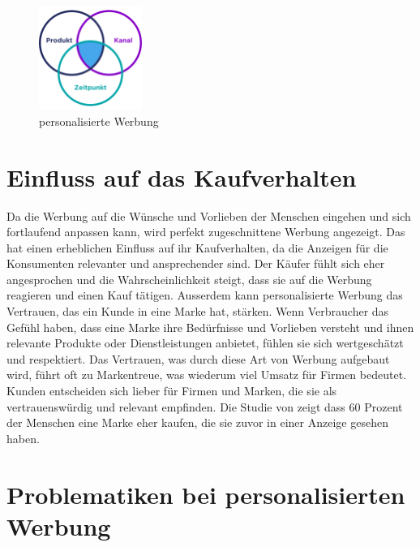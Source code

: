 \documentclass{article}
\begin{document}
 \begin{figure}[ht]
    \centering
    \includegraphics[width=0.3\textwidth]{Infografik.jpg}
    \caption{personalisierte Werbung}
    \label{fig:personaliserte Werbung}
    \end{figure}

 \section{Einfluss auf das Kaufverhalten}
Da die Werbung auf die Wünsche und Vorlieben der Menschen eingehen und sich fortlaufend anpassen kann, wird perfekt zugeschnittene Werbung angezeigt. Das hat einen erheblichen Einfluss auf ihr Kaufverhalten, da die Anzeigen für die Konsumenten relevanter und ansprechender sind. Der Käufer fühlt sich eher angesprochen und die Wahrscheinlichkeit steigt, dass sie auf die Werbung reagieren und einen Kauf tätigen. Ausserdem kann personalisierte Werbung das Vertrauen, das ein Kunde in eine Marke hat, stärken. Wenn Verbraucher das Gefühl haben, dass eine Marke ihre Bedürfnisse und Vorlieben versteht und ihnen relevante Produkte oder Dienstleistungen anbietet, fühlen sie sich wertgeschätzt und respektiert. Das Vertrauen, was durch diese Art von Werbung aufgebaut wird, führt oft zu Markentreue, was wiederum viel Umsatz für Firmen bedeutet. Kunden entscheiden sich lieber für Firmen und Marken, die sie als vertrauenswürdig und relevant empfinden. Die Studie von \citet{Nielsen} zeigt dass 60 Prozent der Menschen eine Marke eher kaufen, die sie zuvor in einer Anzeige gesehen haben.

\section{Problematiken bei personalisierten Werbung}
\end{document}
